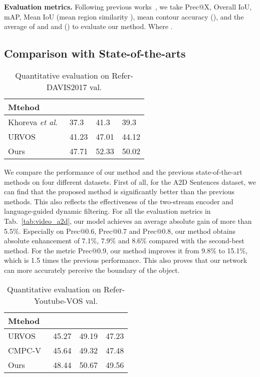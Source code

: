 \documentclass[10pt,twocolumn,letterpaper]{article}
\begin{document}
\noindent\textbf{Evaluation metrics.}
Following previous works~\cite{seo2020urvos,hui2021collaborative}, we take Prec@X, Overall IoU, mAP, Mean IoU (mean region similarity ), mean contour accuracy (), and the average of and  and  () to evaluate our method. Where .
\subsection{Comparison with State-of-the-arts}
\begin{table}[t]
\setlength{\tabcolsep}{4pt}
\small
\centering
\caption{Quantitative evaluation on Refer-DAVIS2017 val.} \renewcommand{\arraystretch}{1.0}
\begin{tabular}{p{3cm}<{\centering}||p{1.0cm}<{\centering}|p{1.0cm}<{\centering}|p{1.0cm}<{\centering}}
\hline
\multirow{1}{*}{Mtehod}          &    &  &\\
\hline \hline
Khoreva \emph{et al}.~\cite{khoreva2018video}        &37.3   &41.3  &39.3\\
URVOS~\cite{seo2020urvos}                            &41.23  &47.01 &44.12\\
Ours                                                        &47.71  &52.33 &50.02\\
\hline
\end{tabular}
\label{tab:video_davis}
\end{table}
We compare the performance of our method and the previous state-of-the-art methods on four different datasets.
First of all, for the A2D Sentences dataset, we can find that the proposed method is significantly better than the previous methods. This also reflects the effectiveness of the two-stream encoder and language-guided dynamic filtering.
For all the evaluation metrics in Tab.~\ref{tab:video_a2d}, our model achieves an average absolute gain of more than 5.5\%. Especially on Prec@0.6, Prec@0.7 and Prec@0.8, our method obtains absolute enhancement of 7.1\%, 7.9\% and 8.6\% compared with the second-best method. For the metric Prec@0.9, our method improves it from 9.8\% to 15.1\%, which is 1.5 times the previous performance. This also proves that our network can more accurately perceive the boundary of the object.
\begin{table}[t]
\setlength{\tabcolsep}{4pt}
\small
\centering
\caption{Quantitative evaluation on Refer-Youtube-VOS val.} \renewcommand{\arraystretch}{1.0}
\begin{tabular}{p{3cm}<{\centering}||p{1.0cm}<{\centering}|p{1.0cm}<{\centering}|p{1.0cm}<{\centering}}
\hline
\multirow{1}{*}{Mtehod}          &    &  &\\
\hline \hline
URVOS~\cite{seo2020urvos}             &45.27         &49.19        &47.23\\
CMPC-V~\cite{liu2021cross}            &45.64         &49.32        &47.48\\
Ours                                         &48.44         &50.67        &49.56\\
\hline
\end{tabular}
\label{tab:video_youtube}
\end{table}
\end{document}
